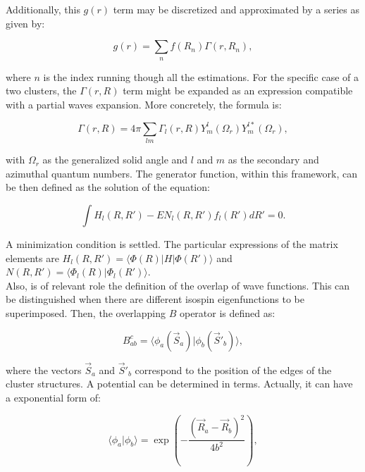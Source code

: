 \documentclass[openany]{book}
\begin{document}
Additionally, this $g(r)$ term may be discretized and approximated by a series as given by: 

\begin{equation}\label{eq:micro_cluster_equivalency_GCM_g_series}
	g(r) = \sum_n f(R_n) \Gamma(r, R_n),
\end{equation}

where $n$ is the index running though all the estimations. For the specific case of a two clusters, the $\Gamma(r, R)$ term might be expanded as an expression compatible with a partial waves expansion. More concretely, the formula is:

\begin{equation}\label{eq:micro_cluster_gamma}
	\Gamma(r, R) = 4\pi \sum_{lm} {\Gamma_l(r, R) Y^{l}_m(\Omega_r) Y^{l*}_m(\Omega_r)},
\end{equation}

with $\Omega_r$ as the generalized solid angle and $l$ and $m$ as the secondary and azimuthal quantum numbers. The generator function, within this framework, can be then defined as the solution of the equation: 

\begin{equation}\label{eq:micro_cluster_g_equation}
	\int H_l(R, R') - E N_l(R, R') f_l(R') dR' = 0.
\end{equation}

A minimization condition is settled. The particular expressions of the matrix elements are $ H_l(R, R') = \langle  \Phi(R) | H | \Phi(R') \rangle $ and $ N(R, R') = \langle  \Phi_l(R) | \Phi_l(R') \rangle $. \\

Also, is of relevant role the definition of the overlap of wave functions. This can be distinguished when there are different isospin eigenfunctions to be superimposed. Then, the overlapping $B$ operator is defined as: 

\begin{equation}\label{eq:micro_cluster_overlapping}
	B^{c}_{ab} = \langle  \phi_a (\vec S_a)| \phi_b(\vec S'_b) \rangle ,
\end{equation}

where the vectors $\vec S_a$ and $\vec S'_b$ correspond to the position of the edges of the cluster structures. A potential can be determined in terms. Actually, it can have a exponential form of: 

\begin{equation}\label{eq:micro_cluster_overlapping_exp}
	\langle \phi_a | \phi_b \rangle  = \exp {\left(-\frac{(\vec R_a - \vec R_b)^2}{4b^2}\right)},
\end{equation}
\end{document}
